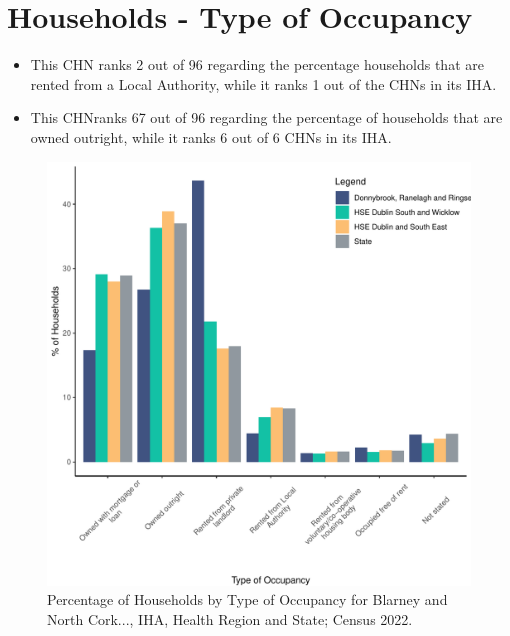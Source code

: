\documentclass{article}
\begin{document}
\section{Households - Type of Occupancy}\label{sect:Households}
\begin{itemize}
\item This CHN ranks  2 out of 96 regarding the percentage households that are rented from a Local Authority, while it ranks  1 out of the CHNs in its IHA. 
\item This CHNranks  67 out of 96 regarding the percentage of households that are owned outright, while it ranks   6 out of 6 CHNs in its IHA.
\end{itemize}
\begin{figure}[H]
	\centering
	\includegraphics[width = 140mm]{../figures/HouseholdsED.pdf}
	\caption{Percentage of Households by Type of Occupancy for Blarney and North Cork..., IHA, Health Region and State; Census 2022.}
	\label{fig:vbnv}
	\end{figure}
\end{document}
